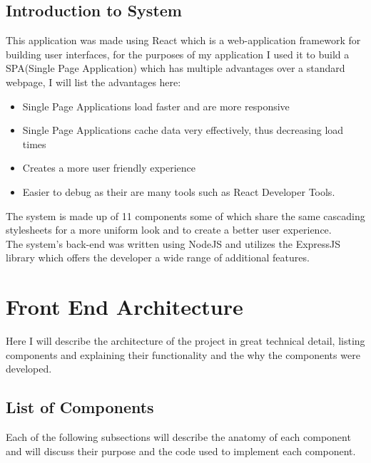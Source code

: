 \subsection{Introduction to System}
This application was made using React which is a web-application framework for building user interfaces,
for the purposes of my application I used it to build a SPA(Single Page Application) which has multiple
advantages over a standard webpage, I will list the advantages here:
\begin{itemize}
  \item Single Page Applications load faster and are more responsive
  \item Single Page Applications cache data very effectively, thus decreasing load times
  \item Creates a more user friendly experience
  \item Easier to debug as their are many tools such as React Developer Tools.
\end{itemize}
The system is made up of 11 components some of which share the same cascading stylesheets for
a more uniform look and to create a better user experience.
\\
The system's back-end was written using NodeJS and utilizes the ExpressJS library
which offers the developer a wide range of additional features.
\section{Front End Architecture}
Here I will describe the architecture of the project in great technical detail, listing components and explaining their functionality and the why the components were developed.
\subsection{List of Components}
Each of the following subsections will describe the anatomy of each component and will discuss their purpose and the code used to implement each component.
